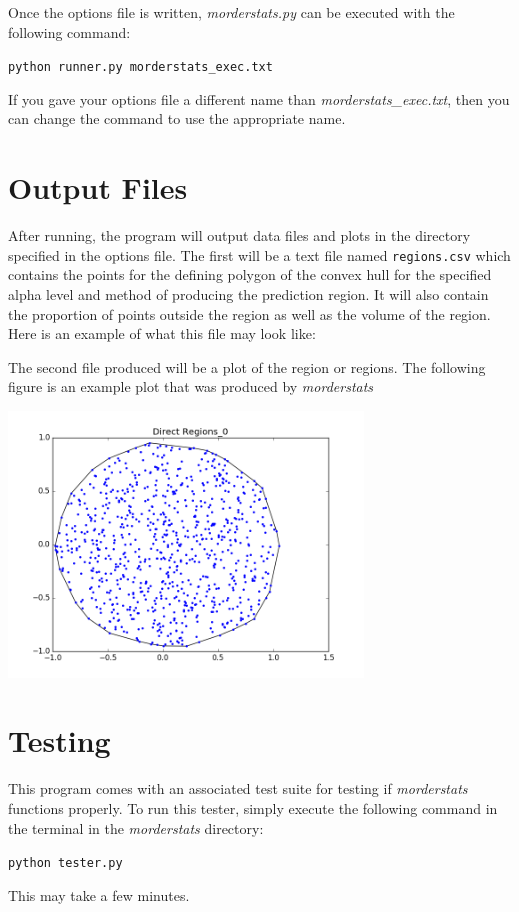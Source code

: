 \documentclass[11pt]{article}
\begin{document}
Once the options file is written, \textit{morderstats.py} can be executed with the following command:
\begin{center}
	\texttt{python runner.py morderstats\_exec.txt}
\end{center}

If you gave your options file a different name than \textit{morderstats\_exec.txt}, then you can change the command to use the appropriate name.

\section{Output Files}
After running, the program will output data files and plots in the directory specified in the options file. The first will be a text file named \texttt{regions.csv} which contains the points for the defining polygon of the convex hull for the specified alpha level and method of producing the prediction region. It will also contain the proportion of points outside the region as well as the volume of the region. Here is an example of what this file may look like:

\begin{framed}
	
\end{framed}

The second file produced will be a plot of the region or regions.
The following figure is an example plot that was produced by \textit{morderstats}

\begin{center}
\includegraphics[height=200pt]{direct_region0.png}
\end{center}

\section{Testing}
This program comes with an associated test suite for testing if \textit{morderstats} functions properly.
To run this tester, simply execute the following command in the terminal in the \textit{morderstats} directory:
\begin{center}
	\texttt{python tester.py}
\end{center}

This may take a few minutes.
\end{document}
